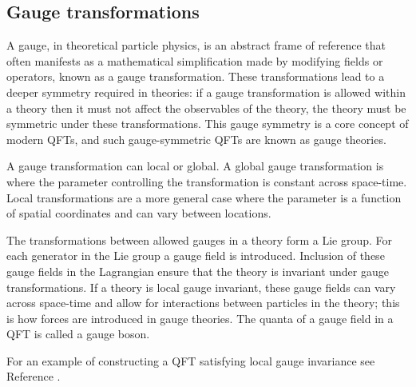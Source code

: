 \subsection{Gauge transformations}

A gauge, in theoretical particle physics, is an abstract frame of reference that
often manifests as a mathematical simplification made by modifying fields or
operators, known as a gauge transformation. These transformations lead to a
deeper symmetry required in theories: if a gauge transformation is allowed
within a theory then it must not affect the observables of the theory, the
theory must be symmetric under these transformations. This gauge symmetry is a
core concept of modern \acp{QFT}, and such gauge-symmetric \acp{QFT} are known
as gauge theories.

A gauge transformation can local or global. A global gauge transformation is
where the parameter controlling the transformation is constant across
space-time. Local transformations are a more general case where the parameter is
a function of spatial coordinates and can vary between locations.

The transformations between allowed gauges in a theory form a Lie group. For
each generator in the Lie group a gauge field is introduced. Inclusion of these
gauge fields in the Lagrangian ensure that the theory is invariant under gauge
transformations. If a theory is local gauge invariant, these gauge fields can
vary across space-time and allow for interactions between particles in the
theory; this is how forces are introduced in gauge theories. The quanta of a
gauge field in a \ac{QFT} is called a gauge boson.

For an example of constructing a \ac{QFT} satisfying local gauge invariance see
Reference \cite[pp.242-3]{Thomson2013}.

